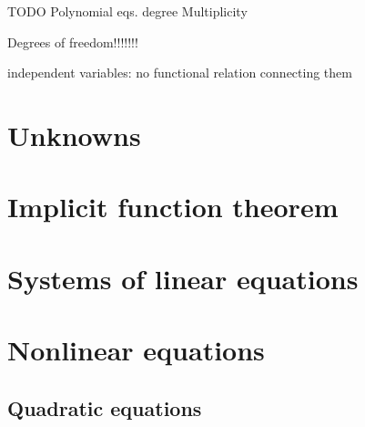 TODO
Polynomial eqs.
degree
Multiplicity

Degrees of freedom!!!!!!!

independent variables: no functional relation connecting them
\section{Unknowns}
\section{Implicit function theorem}
\section{Systems of linear equations}
\section{Nonlinear equations}
\subsection{Quadratic equations}